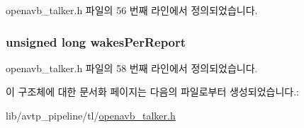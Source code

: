 openavb\+\_\+talker.\+h 파일의 56 번째 라인에서 정의되었습니다.

\subsubsection[{\texorpdfstring{wakes\+Per\+Report}{wakesPerReport}}]{\setlength{\rightskip}{0pt plus 5cm}unsigned long wakes\+Per\+Report}\hypertarget{structtalker__data__t_a0d3335b6780650fc534470f66692e6fd}{}\label{structtalker__data__t_a0d3335b6780650fc534470f66692e6fd}


openavb\+\_\+talker.\+h 파일의 58 번째 라인에서 정의되었습니다.



이 구조체에 대한 문서화 페이지는 다음의 파일로부터 생성되었습니다.\+:\begin{DoxyCompactItemize}
\item 
lib/avtp\+\_\+pipeline/tl/\hyperlink{openavb__talker_8h}{openavb\+\_\+talker.\+h}\end{DoxyCompactItemize}
